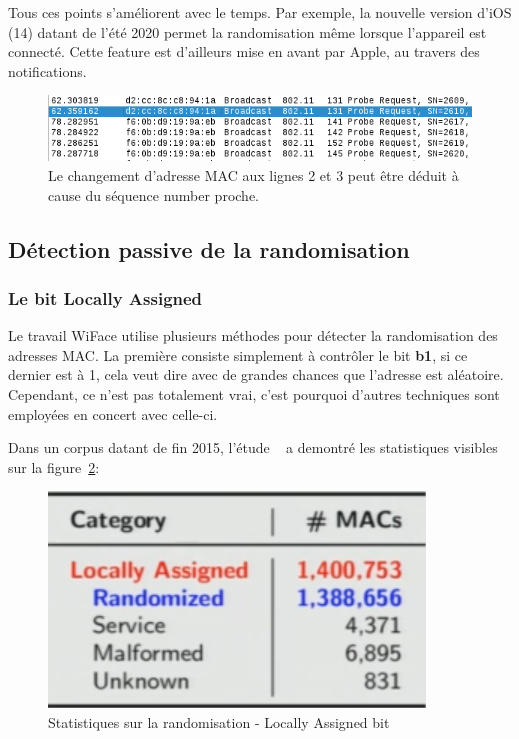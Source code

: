 Tous ces points s'améliorent avec le temps. 
Par exemple, la nouvelle version d'iOS (14) datant de l'été 2020 permet la randomisation même lorsque l'appareil est connecté.
Cette feature est d'ailleurs mise en avant par Apple, au travers des notifications. \cite{APPLESUPPPRIVATE} 

\begin{figure}[H]
	\centering
	\includegraphics[width=12cm]{images/probe/sn.png}
	\caption{Le changement d'adresse MAC aux lignes 2 et 3 peut être déduit à cause du séquence number proche.}
	\label{fig:seqnumber}
\end{figure}

\subsection{Détection passive de la randomisation}

\subsubsection{Le bit Locally Assigned}
Le travail WiFace utilise plusieurs méthodes pour détecter la randomisation des adresses MAC. 
La première consiste simplement à contrôler le bit \textbf{b1}, si ce dernier est à 1, cela veut
dire avec de grandes chances que l'adresse est aléatoire. Cependant, ce n'est pas totalement vrai, c'est pourquoi
d'autres techniques sont employées en concert avec celle-ci. 

Dans un corpus datant de fin 2015, l'étude ~\cite{ASMARMD} a demontré les statistiques visibles sur la figure~\ref{fig:locally_stats}: 

\begin{figure}[H]
	\centering
	\includegraphics[width=10cm]{images/probe/stats_locally_assigned.png}
	\caption{Statistiques sur la randomisation - Locally Assigned bit}
	\label{fig:locally_stats}
\end{figure}

